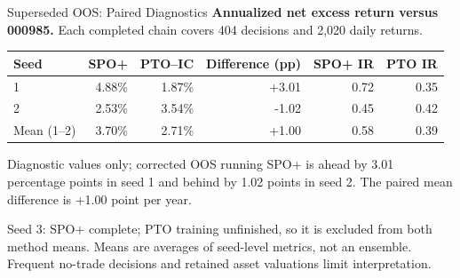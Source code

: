 \documentclass[aspectratio=169,xcolor=dvipsnames]{beamer}
\begin{document}
\begin{frame}{Superseded OOS: Paired Diagnostics}
    \small
    \textbf{Annualized net excess return versus 000985.}
    Each completed chain covers 404 decisions and 2,020 daily returns.
    \vspace{7pt}
    \begin{table}
    \centering\small\setlength{\tabcolsep}{7pt}
    \begin{tabular}{l r r r r r}
    \toprule
    Seed & SPO+ & PTO--IC & Difference (pp) & SPO+ IR & PTO IR \\
    \midrule
1 & 4.88\% & 1.87\% & +3.01 & 0.72 & 0.35 \\
2 & 2.53\% & 3.54\% & -1.02 & 0.45 & 0.42 \\
\midrule
Mean (1--2) & 3.70\% & 2.71\% & +1.00 & 0.58 & 0.39 \\
    \bottomrule
    \end{tabular}
    \end{table}
    \vspace{8pt}
    \begin{block}{Diagnostic values only; corrected OOS running}
    SPO+ is ahead by 3.01 percentage points in seed 1 and behind by
    1.02 points in seed 2. The paired mean difference is +1.00 point per year.
    \end{block}
    \vspace{5pt}
    \footnotesize Seed 3: SPO+ complete; PTO training unfinished, so it is excluded
    from both method means. Means are averages of seed-level metrics, not an ensemble.
    Frequent no-trade decisions and retained asset valuations limit interpretation.
\end{frame}
\end{document}
